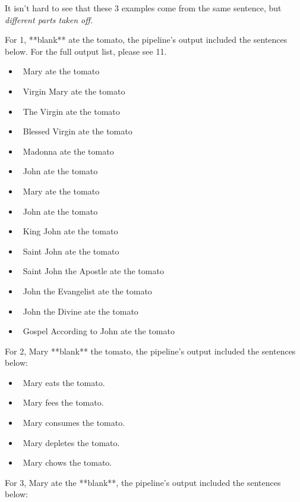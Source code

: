 \documentclass{article}[12pt]
\theoremstyle{definition}
\begin{document}
It isn't hard to see that these 3 examples come from the same sentence, but \emph{different parts taken off.}

For 1, **blank** ate the tomato,  the pipeline's output included the sentences below. For the full output list, please see 11. 

\begin{itemize}
\item\ Mary ate the tomato
\item\ Virgin Mary ate the tomato
\item\ The Virgin ate the tomato
\item\ Blessed Virgin ate the tomato
\item\ Madonna ate the tomato
\item\ John ate the tomato
\item\ Mary ate the tomato
\item\ John ate the tomato
\item\ King John ate the tomato
\item\ Saint John ate the tomato
\item\ Saint John the Apostle ate the tomato
\item\ John the Evangelist ate the tomato
\item\ John the Divine ate the tomato
\item\ Gospel According to John ate the tomato
\end{itemize}


For 2, Mary **blank** the tomato, the pipeline's output included the sentences below: 

\begin{itemize}
\item\ Mary eats the tomato.
\item\ Mary fees the tomato.
\item\ Mary consumes the tomato.
\item\ Mary depletes the tomato.
\item\ Mary chows the tomato.
\end{itemize}

For 3, Mary ate the **blank**, the pipeline's output included the sentences below: 
\end{document}
